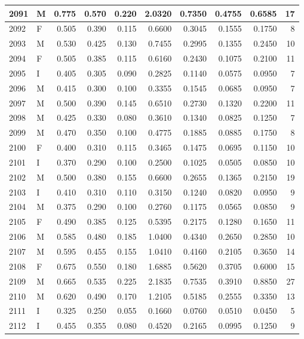 \documentclass[9pt,twocolumn,twoside,]{pnas-new}
\begin{document}
\begin{tabular}{l|l|r|r|r|r|r|r|r|r}
\hline
2091 & M & 0.775 & 0.570 & 0.220 & 2.0320 & 0.7350 & 0.4755 & 0.6585 & 17\\
\hline
2092 & F & 0.505 & 0.390 & 0.115 & 0.6600 & 0.3045 & 0.1555 & 0.1750 & 8\\
\hline
2093 & M & 0.530 & 0.425 & 0.130 & 0.7455 & 0.2995 & 0.1355 & 0.2450 & 10\\
\hline
2094 & F & 0.505 & 0.385 & 0.115 & 0.6160 & 0.2430 & 0.1075 & 0.2100 & 11\\
\hline
2095 & I & 0.405 & 0.305 & 0.090 & 0.2825 & 0.1140 & 0.0575 & 0.0950 & 7\\
\hline
2096 & M & 0.415 & 0.300 & 0.100 & 0.3355 & 0.1545 & 0.0685 & 0.0950 & 7\\
\hline
2097 & M & 0.500 & 0.390 & 0.145 & 0.6510 & 0.2730 & 0.1320 & 0.2200 & 11\\
\hline
2098 & M & 0.425 & 0.330 & 0.080 & 0.3610 & 0.1340 & 0.0825 & 0.1250 & 7\\
\hline
2099 & M & 0.470 & 0.350 & 0.100 & 0.4775 & 0.1885 & 0.0885 & 0.1750 & 8\\
\hline
2100 & F & 0.400 & 0.310 & 0.115 & 0.3465 & 0.1475 & 0.0695 & 0.1150 & 10\\
\hline
2101 & I & 0.370 & 0.290 & 0.100 & 0.2500 & 0.1025 & 0.0505 & 0.0850 & 10\\
\hline
2102 & M & 0.500 & 0.380 & 0.155 & 0.6600 & 0.2655 & 0.1365 & 0.2150 & 19\\
\hline
2103 & I & 0.410 & 0.310 & 0.110 & 0.3150 & 0.1240 & 0.0820 & 0.0950 & 9\\
\hline
2104 & M & 0.375 & 0.290 & 0.100 & 0.2760 & 0.1175 & 0.0565 & 0.0850 & 9\\
\hline
2105 & F & 0.490 & 0.385 & 0.125 & 0.5395 & 0.2175 & 0.1280 & 0.1650 & 11\\
\hline
2106 & M & 0.585 & 0.480 & 0.185 & 1.0400 & 0.4340 & 0.2650 & 0.2850 & 10\\
\hline
2107 & M & 0.595 & 0.455 & 0.155 & 1.0410 & 0.4160 & 0.2105 & 0.3650 & 14\\
\hline
2108 & F & 0.675 & 0.550 & 0.180 & 1.6885 & 0.5620 & 0.3705 & 0.6000 & 15\\
\hline
2109 & M & 0.665 & 0.535 & 0.225 & 2.1835 & 0.7535 & 0.3910 & 0.8850 & 27\\
\hline
2110 & M & 0.620 & 0.490 & 0.170 & 1.2105 & 0.5185 & 0.2555 & 0.3350 & 13\\
\hline
2111 & I & 0.325 & 0.250 & 0.055 & 0.1660 & 0.0760 & 0.0510 & 0.0450 & 5\\
\hline
2112 & I & 0.455 & 0.355 & 0.080 & 0.4520 & 0.2165 & 0.0995 & 0.1250 & 9\\

\end{tabular}
\end{document}
